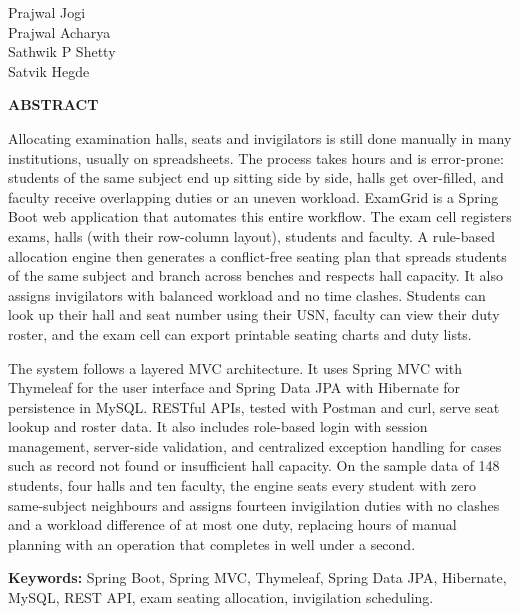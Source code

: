 \documentclass[12pt,a4paper,oneside]{report}
\begin{document}
\hfill Prajwal Jogi\\
\hspace*{\fill} Prajwal Acharya\\
\hspace*{\fill} Sathwik P Shetty\\
\hspace*{\fill} Satvik Hegde
\newpage

\thispagestyle{plain}
\begin{center}{\Large\bfseries\color{egnavy} ABSTRACT}\end{center}
\vspace{0.3cm}
Allocating examination halls, seats and invigilators is still done manually in many institutions, usually on spreadsheets. The process takes hours and is error-prone: students of the same subject end up sitting side by side, halls get over-filled, and faculty receive overlapping duties or an uneven workload. ExamGrid is a Spring Boot web application that automates this entire workflow. The exam cell registers exams, halls (with their row-column layout), students and faculty. A rule-based allocation engine then generates a conflict-free seating plan that spreads students of the same subject and branch across benches and respects hall capacity. It also assigns invigilators with balanced workload and no time clashes. Students can look up their hall and seat number using their USN, faculty can view their duty roster, and the exam cell can export printable seating charts and duty lists.

The system follows a layered MVC architecture. It uses Spring MVC with Thymeleaf for the user interface and Spring Data JPA with Hibernate for persistence in MySQL. RESTful APIs, tested with Postman and curl, serve seat lookup and roster data. It also includes role-based login with session management, server-side validation, and centralized exception handling for cases such as record not found or insufficient hall capacity. On the sample data of 148 students, four halls and ten faculty, the engine seats every student with zero same-subject neighbours and assigns fourteen invigilation duties with no clashes and a workload difference of at most one duty, replacing hours of manual planning with an operation that completes in well under a second.

\vspace{0.3cm}\noindent\textbf{Keywords:} Spring Boot, Spring MVC, Thymeleaf, Spring Data JPA, Hibernate, MySQL, REST API, exam seating allocation, invigilation scheduling.
\newpage
\end{document}
